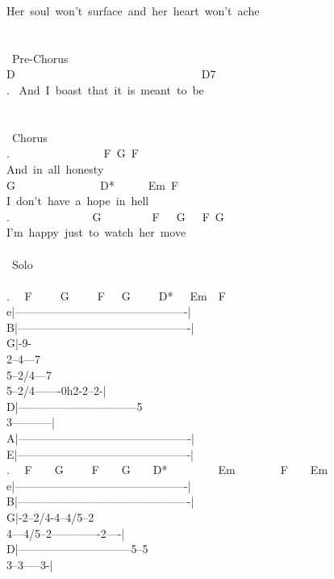 {Her\ soul\ won't\ surface\ and\ her\ heart\ won't\ ache\\
\\
\\
\lbrack\ Pre-Chorus\rbrack\\
D\ \ \ \ \ \ \ \ \ \ \ \ \ \ \ \ \ \ \ \ \ \ \ \ \ \ \ \ \ \ \ \ \ D7\\
. \ And\ I\ boast\ that\ it\ is\ meant\ to\ be\\
\\
\\
\lbrack\ Chorus\rbrack\\
. \ \ \ \ \ \ \ \ \ \ \ \ \ \ \ \ F\ G\ F\\
And\ in\ all\ honesty\\
G\ \ \ \ \ \ \ \ \ \ \ \ \ \ \ D*\ \ \ \ \ \ Em\ F\\
I\ don't\ have\ a\ hope\ in\ hell\\
. \ \ \ \ \ \ \ \ \ \ \ \ \ \ G\ \ \ \ \ \ \ \ \ F\ \ \ G\ \ \ F\ G\\
I'm\ happy\ just\ to\ watch\ her\ move\\
\\
\lbrack\ Solo\rbrack\\
\\
. \ \ F\ \ \ \ \ G\ \ \ \ \ F\ \ \ G\ \ \ \ \ D*\ \ \ Em\ \ F\\
e|----------------------------------------------|\\
B|----------------------------------------------|\\
G|-9-\\2--4---7\\5--2/4---7\\5--2/4-------0h2-2--2-|\\
D|--------------------------------5\\3-----------|\\
A|----------------------------------------------|\\
E|----------------------------------------------|\\
. \ \ F\ \ \ \ G\ \ \ \ \ F\ \ \ \ G\ \ \ \ D*\ \ \ \ \ \ \ \ \ Em\ \ \ \ \ \ \ \ F\ \ \ \ Em\\
e|----------------------------------------------|\\
B|----------------------------------------------|\\
G|-2--2/4-4--4/5--2\\4---4/5--2-------------2----|\\
D|------------------------------5--5\\3--3-----3-|\\
}
